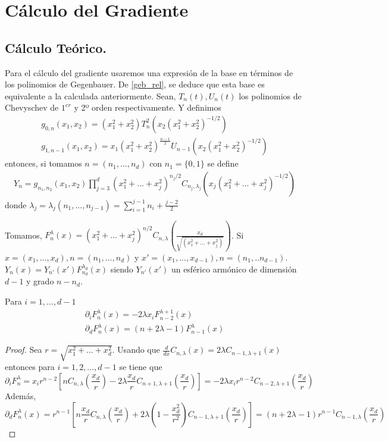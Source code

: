 \chapter[Cálculo del Gradiente]
		{Cálculo del Gradiente}
\section{Cálculo Teórico.}
Para el cálculo del gradiente usaremos una expresión de la base en términos de los polinomios de Gegenbauer. De \ref{geb_rel}, se deduce que esta base es equivalente a la calculada anteriormente.
Sean, $T_{n}(t),U_{n}(t)$ los polinomios de Chevyschev de $1^{er}$ y 2º orden respectivamente.	Y definimos
\begin{gather*}
 g_{0,n}(x_1,x_2) = (x_1^2+x_2^2)T_n^2(x_2(x_1^2+x_2^2)^{-1/2})
\\
g_{1,n-1}(x_1,x_2) = x_1(x_1^2+x_2^2)^{\frac{n-1}{2}}U_{n-1}(x_2(x_1^2+x_2^2)^{-1/2})
\end{gather*}
entonces, si tomamos $n=(n_1,...,n_d)$ con $n_1 = \{0,1\}$ se define
\begin{gather*}
Y_n = g_{n_1,n_2}(x_1,x_2)\prod_{j=3}^{d}(x_1^2+...+x_j^2)^{n_j/2}C_{n_j,\lambda_j}(x_j(x_1^2+...+x_j^2)^{-1/2})
\end{gather*}
donde $\lambda_j =\lambda_j(n_1,...,n_{j-1}) = \sum_{i=1}^{j-1}n_i + \frac{j-2}{2}$


Tomamos, $F_n^\lambda (x) = (x_1^2+...+x_j^2)^{n/2}C_{n,\lambda}(\frac{x_d}{\sqrt{(x_1^2+...+x_j^2)}})$.
Si $x=(x_1,...,x_d), n=(n_1,...,n_d)$ y $x' = (x_1,...,x_{d-1}), n=(n_1,..n_{d-1})$.
$Y_n(x) = Y_{n'}(x') F_{n_d}^{\lambda_d} (x)$ siendo $ Y_{n'}(x')$ un esférico armónico de dimensión $d-1$ y grado $n-n_d$.
\begin{prop}Para $i=1,...,d-1$
	\begin{gather*}
	\partial_i  F_{n}^\lambda(x) = -2\lambda x_i F_{n-2}^{\lambda+1}(x) \\ 
	\partial_d F_{n}^{\lambda}(x) = (n+2\lambda-1)  F_{n-1}^{\lambda}(x)
	\end{gather*}
\end{prop}
\begin{proof}
	Sea $r=\sqrt{x_1^2+...+x_d^2}$. Usando que $\frac{d}{dx}C_{n,\lambda}(x) = 2\lambda C_{n-1,\lambda+1}(x)$ entonces para $i=1,2,...,d-1$ se tiene que$$
	\partial_i F_{n}^{\lambda} = x_i r^{n-2} \left[ n C_{n,\lambda}(\frac{x_d}{r})-2\lambda\frac{x_d}{r}C_{n+1,\lambda+1}(\frac{x_d}{r})\right] = -2\lambda x_ir^{n-2}C_{n-2,\lambda+1}(\frac{x_d}{r})
	$$
	Además, $$
	\partial_d F_{n}^{\lambda}(x) = r^{n-1}\left[n\frac{x_d}{r}C_{n,\lambda}(\frac{x_d}{r})+2\lambda(1-\frac{x_d^2}{r^2})C_{n-1,\lambda+1}(\frac{x_d}{r})\right] = (n+2\lambda-1)r^{n-1}C_{n-1,\lambda}(\frac{x_d}{r})
	$$
\end{proof}

